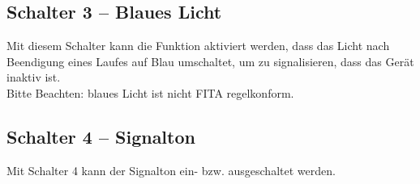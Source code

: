 \documentclass[12pt,a4paper,final]{article}
\begin{document}
\subsection{Schalter 3 -- Blaues Licht}
Mit diesem Schalter kann die Funktion aktiviert werden, dass das Licht nach Beendigung eines Laufes auf Blau umschaltet, um zu signalisieren, dass das Gerät inaktiv ist.\\
Bitte Beachten: blaues Licht ist nicht FITA regelkonform.
\subsection{Schalter 4 -- Signalton}
Mit Schalter 4 kann der Signalton ein- bzw. ausgeschaltet werden.
\end{document}
